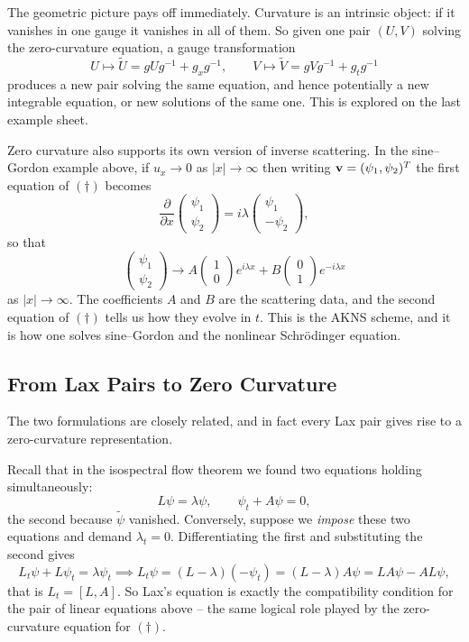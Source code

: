\documentclass[a4paper]{scrartcl}
\begin{document}
The geometric picture pays off immediately. Curvature is an intrinsic object: if it vanishes in one gauge it vanishes in all of them. So given one pair $(U, V)$ solving the zero-curvature equation, a gauge transformation
$$
U\mapsto \tilde U = gUg^{-1} + g_xg^{-1}, \qquad V\mapsto\tilde V = gVg^{-1} + g_tg^{-1}
$$
produces a new pair solving the same equation, and hence potentially a new integrable equation, or new solutions of the same one. This is explored on the last example sheet.

Zero curvature also supports its own version of inverse scattering. In the sine--Gordon example above, if $u_x\to0$ as $|x|\to\infty$ then writing $\mathbf{v} = (\psi_1,\psi_2)^T$ the first equation of $(\dagger)$ becomes
$$
\frac{\partial}{\partial x}\begin{pmatrix}\psi_1\\\psi_2\end{pmatrix} = i\lambda\begin{pmatrix}\psi_1\\-\psi_2\end{pmatrix},
$$
so that
$$
\begin{pmatrix}\psi_1\\\psi_2\end{pmatrix}\to A\begin{pmatrix}1\\0\end{pmatrix}e^{i\lambda x} + B\begin{pmatrix}0\\1\end{pmatrix}e^{-i\lambda x}
$$
as $|x|\to\infty$. The coefficients $A$ and $B$ are the scattering data, and the second equation of $(\dagger)$ tells us how they evolve in $t$. This is the AKNS scheme, and it is how one solves sine--Gordon and the nonlinear Schr\"odinger equation.

\subsection{From Lax Pairs to Zero Curvature}

The two formulations are closely related, and in fact every Lax pair gives rise to a zero-curvature representation.

Recall that in the isospectral flow theorem we found two equations holding simultaneously:
$$
L\psi = \lambda\psi, \qquad \psi_t + A\psi = 0,
$$
the second because $\tilde\psi$ vanished. Conversely, suppose we \emph{impose} these two equations and demand $\lambda_t = 0$. Differentiating the first and substituting the second gives
$$
L_t\psi + L\psi_t = \lambda\psi_t \implies L_t\psi = (L - \lambda)(-\psi_t) = (L-\lambda)A\psi = LA\psi - AL\psi,
$$
that is $L_t = [L,A]$. So Lax's equation is exactly the compatibility condition for the pair of linear equations above -- the same logical role played by the zero-curvature equation for $(\dagger)$.
\end{document}
